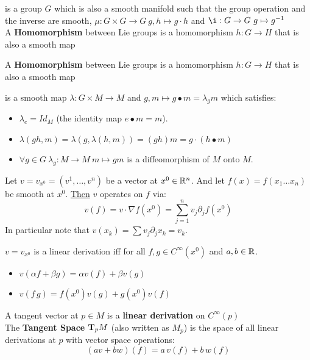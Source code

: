 \documentclass{beamer}
\begin{document}
\begin{frame}
\begin{ddef}
is a group $G$ which is also a smooth manifold such that the group operation and the inverse are smooth, $\mu: G\times G \to G \ g,h\mapsto g\cdot h$ and $\i: G\to G\ g\mapsto g^{-1}$\\
A \textbf{Homomorphism} between Lie groups is a homomorphism $h:G\to H$ that is also a smooth map
\end{ddef}
\begin{ddef}
A \textbf{Homomorphism} between Lie groups is a homomorphism $h:G\to H$ that is also a smooth map
\end{ddef}
\begin{ddef}
is a smooth map $\lambda: G\times M \to M$ and $g,m \mapsto g\bullet m = \lambda_g m $ which satisfies:
    \begin{itemize}
    \item $\lambda_e=Id_M$ (the identity map $e\bullet m=m$).
    \item $\lambda(gh,m) = \lambda(g, \lambda(h,m))= (gh)m = g\cdot (h\bullet m)$
    \item $\forall g\in G \ \lambda_g: M\to M\ m\mapsto gm$ is a diffeomorphism of $M$ onto $M$.
    \end{itemize}
\end{ddef}
\begin{ddef}
Let $v=v_{x^0}=(v^1,\ldots , v^n)$ be a vector at $x^0\in \mathbb{R}^n$. And let $f(x)=f(x_1\ldots x_n)$ be smooth at $x^0$. \underline{Then} $v$ operates on $f$ via: $$v(f)=v\cdot \nabla f(x^0) = \sum_{j=1}^n v_j \partial_j f(x^0)$$
In particular note that $v(x_k)= \sum v_j\partial_j x_k = v_k$. 
\end{ddef} 
\begin{ddef}
$v=v_{x^0}$ is a linear derivation iff for all $f,g\in C^\infty (x^0)$ and $a,b\in\mathbb{R}$.
\begin{itemize}
\item $v(\alpha f + \beta g) = \alpha v(f) + \beta v(g)$
\item $v(f\, g) = f(x^0)v(g) + g(x^0)v(f)$
\end{itemize}
\end{ddef}
\end{frame}
\begin{frame}
\begin{ddef}
A tangent vector at $p\in M$ is a \textbf{linear derivation} on $C^\infty(p)$ \\
The \textbf{Tangent Space} $\text{\textbf{T}}_p M$ (also written as $M_p$) is the space of all linear derivations at $p$ with vector space operations: $$ (av+bw)(f) = a\, v(f) + b\, w(f)$$
\end{ddef}
\end{frame}
\end{document}
